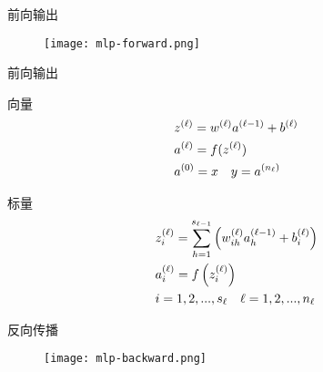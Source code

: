 \begin{frame}{前向输出}
  \begin{figure}
    \centering
    \texttt{[image: mlp-forward.png]}
  \end{figure}
\end{frame}

\begin{frame}{前向输出}
\begin{block}{向量}
\[\begin{gathered}
  {z^{(\ell )}} = {w^{(\ell )}}{a^{(\ell  - 1)}} + {b^{(\ell )}} \hfill \\
  {a^{(\ell )}} = f({z^{(\ell )}}) \hfill \\
  {a^{(0)}} = x \quad y = {a^{({n_\ell })}} \hfill \\ 
\end{gathered} \]
\end{block}

\begin{block}{标量}
\[\begin{gathered}
  z_i^{(\ell )} = \sum\limits_{h = 1}^{{s_{\ell  - 1}}} {\left( {w_{ih}^{(\ell )}a_h^{(\ell  - 1)} + b_i^{(\ell )}} \right)}  \hfill \\
  a_i^{(\ell )} = f\left( {z_i^{(\ell )}} \right) \hfill \\
  i = 1,2,...,{s_\ell } \quad \ell  = 1,2,...,{n_\ell } \hfill \\ 
\end{gathered} \]
\end{block}
\end{frame}

\begin{frame}{反向传播}
  \begin{figure}
    \centering
    \texttt{[image: mlp-backward.png]}
  \end{figure}
\end{frame}

